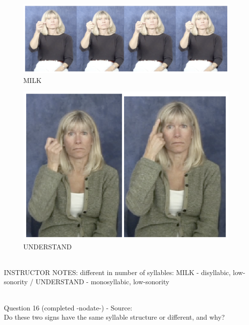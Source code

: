 \documentclass[12pt]{article}
\begin{document}
\begin{figure}[H]
\includegraphics{../images/asl_milk.png}
\caption{MILK}
\end{figure}
\begin{figure}[H]
\includegraphics{../images/asl_understand.png}
\caption{UNDERSTAND}
\end{figure}

~\\
INSTRUCTOR NOTES: different in number of syllables: MILK - disyllabic, low-sonority / UNDERSTAND - monosyllabic, low-sonority


~\\

{\large Question 16} (completed -nodate-) - Source: \\

Do these two signs have the same syllable structure or different, and why?\\
\end{document}
